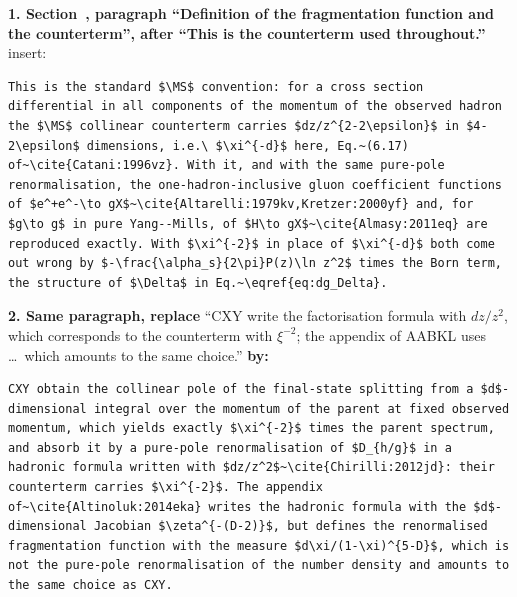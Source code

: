 \noindent\textbf{1. Section~, paragraph ``Definition of the fragmentation function and the counterterm'', after ``This is the counterterm used throughout.''} insert:
\begin{lstlisting}
This is the standard $\MS$ convention: for a cross section differential in all components of the momentum of the observed hadron the $\MS$ collinear counterterm carries $dz/z^{2-2\epsilon}$ in $4-2\epsilon$ dimensions, i.e.\ $\xi^{-d}$ here, Eq.~(6.17) of~\cite{Catani:1996vz}. With it, and with the same pure-pole renormalisation, the one-hadron-inclusive gluon coefficient functions of $e^+e^-\to gX$~\cite{Altarelli:1979kv,Kretzer:2000yf} and, for $g\to g$ in pure Yang--Mills, of $H\to gX$~\cite{Almasy:2011eq} are reproduced exactly. With $\xi^{-2}$ in place of $\xi^{-d}$ both come out wrong by $-\frac{\alpha_s}{2\pi}P(z)\ln z^2$ times the Born term, the structure of $\Delta$ in Eq.~\eqref{eq:dg_Delta}.
\end{lstlisting}

\noindent\textbf{2. Same paragraph, replace} ``CXY write the factorisation formula with $dz/z^2$, which corresponds to the counterterm with $\xi^{-2}$; the appendix of AABKL uses \ldots\ which amounts to the same choice.'' \textbf{by:}
\begin{lstlisting}
CXY obtain the collinear pole of the final-state splitting from a $d$-dimensional integral over the momentum of the parent at fixed observed momentum, which yields exactly $\xi^{-2}$ times the parent spectrum, and absorb it by a pure-pole renormalisation of $D_{h/g}$ in a hadronic formula written with $dz/z^2$~\cite{Chirilli:2012jd}: their counterterm carries $\xi^{-2}$. The appendix of~\cite{Altinoluk:2014eka} writes the hadronic formula with the $d$-dimensional Jacobian $\zeta^{-(D-2)}$, but defines the renormalised fragmentation function with the measure $d\xi/(1-\xi)^{5-D}$, which is not the pure-pole renormalisation of the number density and amounts to the same choice as CXY.
\end{lstlisting}

